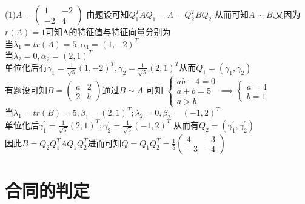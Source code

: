 \documentclass[12pt, a4paper, oneside, UTF8]{ctexbook}
\begin{document}
\begin{enumerate}[label=\arabic*.]
    \begin{solution}
    (1)$A=\begin{pmatrix}
        1 & -2 \\
        -2 & 4
    \end{pmatrix}$ 由题设可知$Q_1^TAQ_1=\Lambda=Q_2^TBQ_2$ 从而可知$A\sim B$,又因为$r(A)=1$可知A的特征值与特征向量分别为\\
    当$\lambda_1=tr(A)=5,\alpha_1=(1,-2)^T$ \\
    当$\lambda_2=0,\alpha_2=(2,1)^T$ \\
    单位化后有$\gamma_1=\frac{1}{\sqrt{5}}(1,-2)^T,\gamma_2=\frac{1}{\sqrt{5}}(2,1)^T$从而$Q_1=(\gamma_1,\gamma_2)$ \\
    有题设可知$B=\begin{pmatrix}
        a & 2 \\
        2 & b 
    \end{pmatrix}$通过$B\sim A$ 可知 $\begin{cases}
        ab - 4 = 0 \\
        a + b = 5 \\
        a > b 
    \end{cases}\implies \begin{cases}
        a = 4 \\
        b = 1
    \end{cases}$\\
    当$\lambda_1=tr(B)=5,\beta_1=(2,1)^T;\lambda_2=0,\beta_2=(-1,2)^T$ \\
    单位化后$\gamma_1^{'}=\frac{1}{\sqrt{5}}(2,1)^T;\gamma_2^{'}=\frac{1}{\sqrt{5}}(-1,2)^T$ 从而有$Q_2=(\gamma_1^{'},\gamma_2^{'})$ \\
    因此$B=Q_2Q_1^TAQ_1Q_2^T$进而可知$Q=Q_1Q_2^T=\frac{1}{5}\begin{pmatrix}
        4 & -3 \\
        -3 & -4
    \end{pmatrix}$
    \end{solution}
\end{enumerate}

\section{合同的判定}
\end{document}
